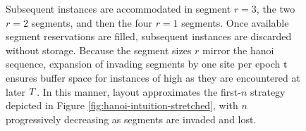 \begin{figure}[htbp!]
{    Subsequent \hv{} instances are accommodated in segment $r=3$, the two $r=2$ segments, and then the four $r=1$ segments.
    Once available segment reservations are filled, subsequent \hv{} instances are discarded without storage.
    Because the segment sizes $r$ mirror the hanoi sequence, expansion of invading segments by one site per epoch $\colort$ ensures buffer space for instances of high \hv{} as they are encountered at later $\colorT$.
  In this manner, layout approximates the first-$n$ \hv{} strategy depicted in Figure \ref{fig:hanoi-intuition-stretched}, with $n$ progressively decreasing as segments are invaded and lost.
  }
  \label{fig:hsurf-stretched-intuition}
\end{figure}
